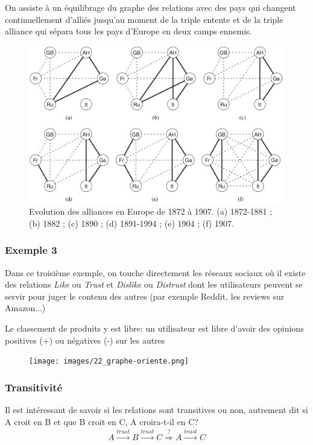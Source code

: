 On assiste à un équilibrage du graphe des relations avec des pays qui changent continuellement d'alliés jusqu'au moment de la triple entente et de la triple alliance qui sépara tous les pays d'Europe en deux camps ennemis.

\begin{figure}[!ht]
    \centering
    \includegraphics[width=0.9\linewidth]{images/22_first_world_war.png}
    \caption{Evolution des alliances en Europe de 1872 à 1907. (a)
        1872-1881 ; (b) 1882 ; (c) 1890 ; (d) 1891-1994 ; (e) 1904 ; (f)
    1907.}
    \label{first_world_war}
\end{figure}

\subsubsection*{Exemple 3}
Dans ce troisième exemple, on touche directement les réseaux sociaux où il existe des relations \textit{Like} ou \textit{Trust} et \textit{Dislike} ou \textit{Distrust} dont les utilisateurs peuvent se servir pour juger le contenu des autres (par exemple Reddit, les reviews sur Amazon...)

Le classement de produits y est libre: un utilisateur est libre d'avoir des opinions positives (+) ou négatives (-) sur les autres

\begin{figure}[!h]
	\centering
	\texttt{[image: images/22\_graphe-oriente.png]}
\end{figure}

\subsubsection*{Transitivité}  

Il est intéressant de savoir si les relations sont transitives ou non, autrement dit si A croit en B et que B croit en C, A croira-t-il en C?
\begin{align*}
A \overset{trust}{\longrightarrow} B \overset{trust}{\longrightarrow} C \overset{?}{\Longrightarrow} A \overset{trust}{\longrightarrow} C
\end{align*}

